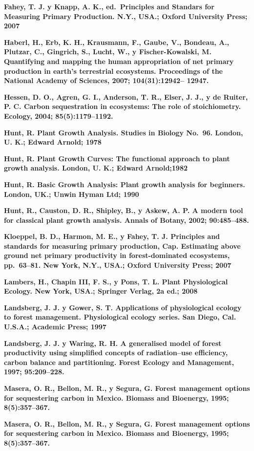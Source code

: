 \documentclass[
]{article}
\begin{document}
\textbf{Fahey, T. J. y Knapp, A. K., ed.~Principles and Standars for
Measuring Primary Production. N.Y., USA.; Oxford University Press; 2007}

\textbf{Haberl, H., Erb, K. H., Krausmann, F., Gaube, V., Bondeau, A.,
Plutzar, C., Gingrich, S., Lucht, W., y Fischer-Kowalski, M. Quantifying
and mapping the human appropriation of net primary production in earth's
terrestrial ecosystems. Proceedings of the National Academy of Sciences,
2007; 104(31):12942-- 12947.}

\textbf{Hessen, D. O., Agren, G. I., Anderson, T. R., Elser, J. J., y de
Ruiter, P. C. Carbon sequestration in ecosystems: The role of
stoichiometry. Ecology, 2004; 85(5):1179--1192.}

\textbf{Hunt, R. Plant Growth Analysis. Studies in Biology No.~96.
London, U. K.; Edward Arnold; 1978}

\textbf{Hunt, R. Plant Growth Curves: The functional approach to plant
growth analysis. London, U. K.; Edward Arnold;1982}

\textbf{Hunt, R. Basic Growth Analysis: Plant growth analysis for
beginners. London, UK.; Unwin Hyman Ltd; 1990}

\textbf{Hunt, R., Causton, D. R., Shipley, B., y Askew, A. P. A modern
tool for classical plant growth analysis. Annals of Botany, 2002;
90:485--488.}

\textbf{Kloeppel, B. D., Harmon, M. E., y Fahey, T. J. Principles and
standards for measuring primary production, Cap. Estimating above ground
net primary productivity in forest-dominated ecosystems, pp.~63--81. New
York, N.Y., USA.; Oxford University Press; 2007}

\textbf{Lambers, H., Chapin III, F. S., y Pons, T. L. Plant
Physiological Ecology. New York, USA.; Springer Verlag, 2a ed.; 2008}

\textbf{Landsberg, J. J. y Gower, S. T. Applications of physiological
ecology to forest management. Physiological ecology series. San Diego,
Cal. U.S.A.; Academic Press; 1997}

\textbf{Landsberg, J. J. y Waring, R. H. A generalised model of forest
productivity using simplified concepts of radiation--use efficiency,
carbon balance and partitioning. Forest Ecology and Management, 1997;
95:209--228.}

\textbf{Masera, O. R., Bellon, M. R., y Segura, G. Forest management
options for sequestering carbon in Mexico. Biomass and Bioenergy, 1995;
8(5):357--367.}

\textbf{Masera, O. R., Bellon, M. R., y Segura, G. Forest management
options for sequestering carbon in Mexico. Biomass and Bioenergy, 1995;
8(5):357--367.}
\end{document}
